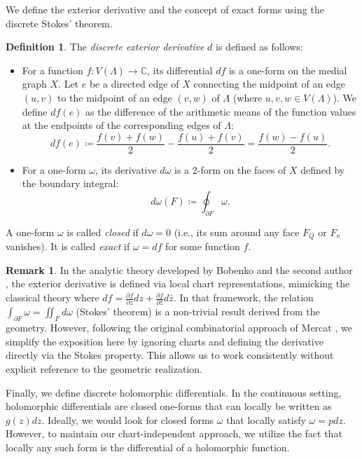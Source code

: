 \documentclass[11pt,a4paper]{article}
\theoremstyle{definition}
\newtheorem*{definition}{Definition}
\newtheorem*{remark}{Remark}
\begin{document}
We define the exterior derivative and the concept of exact forms using the discrete Stokes' theorem.

\begin{definition}
	The \textit{discrete exterior derivative} $d$ is defined as follows:
	\begin{itemize}
		\item For a function $f: V(\Lambda) \to \mathds{C}$, its differential $df$ is a one-form on the medial graph $X$. Let $e$ be a directed edge of $X$ connecting the midpoint of an edge $(u,v)$ to the midpoint of an edge $(v,w)$ of $\Lambda$ (where $u,v,w \in V(\Lambda)$). We define $df(e)$ as the difference of the arithmetic means of the function values at the endpoints of the corresponding edges of $\Lambda$:
		\[ df(e) \coloneq \frac{f(v) + f(w)}{2} - \frac{f(u) + f(v)}{2} = \frac{f(w) - f(u)}{2}. \]
		\item For a one-form $\omega$, its derivative $d\omega$ is a 2-form on the faces of $X$ defined by the boundary integral:
		\[ d\omega(F) \coloneq \oint_{\partial F} \omega. \]
	\end{itemize}
	A one-form $\omega$ is called \textit{closed} if $d\omega = 0$ (i.e., its sum around any face $F_Q$ or $F_v$ vanishes). It is called \textit{exact} if $\omega = df$ for some function $f$.
\end{definition}

\begin{remark}
	In the analytic theory developed by Bobenko and the second author \cite{BoG17}, the exterior derivative is defined via local chart representations, mimicking the classical theory where $df = \frac{\partial f}{\partial z} dz + \frac{\partial f}{\partial \bar{z}} d\bar{z}$. In that framework, the relation $\int_{\partial F} \omega = \iint_F d\omega$ (Stokes' theorem) is a non-trivial result derived from the geometry. However, following the original combinatorial approach of Mercat \cite{Me01}, we simplify the exposition here by ignoring charts and defining the derivative directly via the Stokes property. This allows us to work consistently without explicit reference to the geometric realization.
\end{remark}

Finally, we define discrete holomorphic differentials. In the continuous setting, holomorphic differentials are closed one-forms that can locally be written as $g(z) dz$. Ideally, we would look for closed forms $\omega$ that locally satisfy $\omega = p dz$. However, to maintain our chart-independent approach, we utilize the fact that locally any such form is the differential of a holomorphic function.
\end{document}
